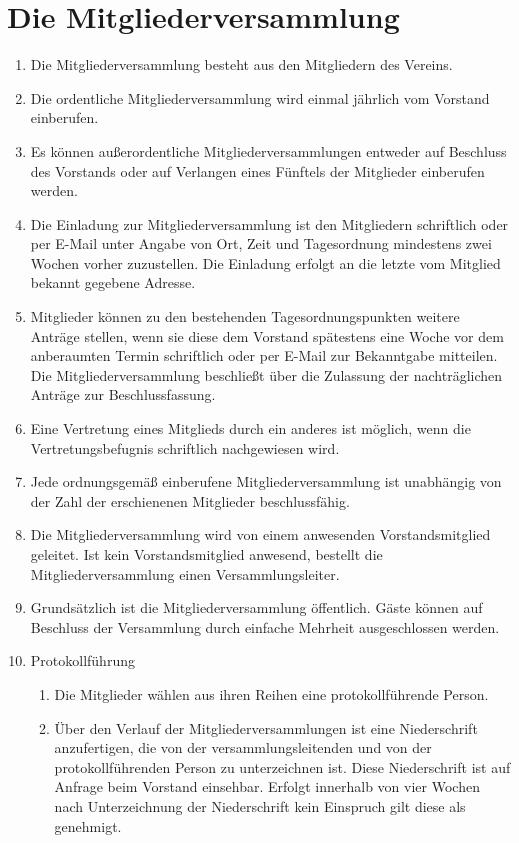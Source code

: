\documentclass[a4paper, 12pt]{scrartcl}
\begin{document}
\section{Die Mitgliederversammlung}
\label{die-mv}
\begin{enumerate}
	\item Die Mitgliederversammlung besteht aus den Mitgliedern des Vereins.
	\item Die ordentliche Mitgliederversammlung wird einmal jährlich vom   Vorstand einberufen.
	\item Es können außerordentliche Mitgliederversammlungen entweder auf Beschluss des Vorstands oder auf Verlangen eines Fünftels der Mitglieder einberufen werden.
	\item \label{mv-einladung} Die Einladung zur Mitgliederversammlung ist den Mitgliedern schriftlich oder per E-Mail unter Angabe von Ort, Zeit und Tagesordnung mindestens zwei Wochen vorher zuzustellen. Die Einladung erfolgt an die letzte vom Mitglied bekannt gegebene Adresse.
	\item \label{mv-nachtrag} Mitglieder können zu den bestehenden Tagesordnungspunkten weitere Anträge stellen, wenn sie diese dem Vorstand spätestens eine Woche vor dem anberaumten Termin schriftlich oder per E-Mail zur Bekanntgabe mitteilen. Die Mitgliederversammlung beschließt über die Zulassung der nachträglichen Anträge zur Beschlussfassung.
	\item Eine Vertretung eines Mitglieds durch ein anderes ist möglich, wenn die Vertretungsbefugnis schriftlich nachgewiesen wird.
	\item Jede ordnungsgemäß einberufene Mitgliederversammlung ist
    unabhängig von der Zahl der erschienenen Mitglieder
    beschlussfähig.
	\item Die Mitgliederversammlung wird von einem anwesenden Vorstandsmitglied geleitet. Ist kein Vorstandsmitglied anwesend, bestellt die Mitgliederversammlung einen Versammlungsleiter.
	\item Grundsätzlich ist die Mitgliederversammlung öffentlich. Gäste können auf Beschluss der Versammlung durch einfache Mehrheit ausgeschlossen werden.
	\item{Protokollführung}
		\begin{enumerate}
			\item Die Mitglieder wählen aus ihren Reihen eine protokollführende Person.
			\item Über den Verlauf der Mitgliederversammlungen ist eine Niederschrift anzufertigen, die von der versammlungsleitenden und von der protokollführenden Person zu unterzeichnen ist. Diese Niederschrift ist auf Anfrage beim Vorstand einsehbar. Erfolgt innerhalb von vier Wochen nach Unterzeichnung der Niederschrift kein Einspruch gilt diese als genehmigt.

\end{enumerate}
\end{enumerate}
\end{document}
